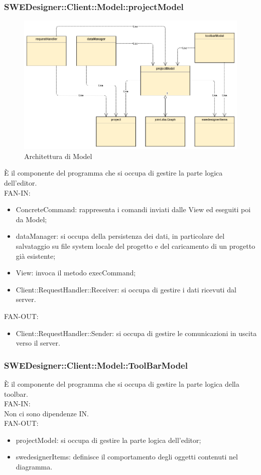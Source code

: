 \documentclass[../PianoDiQualifica.tex]{subfiles}
\begin{document}
		\subsubsection{SWEDesigner::Client::Model::projectModel}
			\begin{figure}[H]\label{fig:Model}
				\centering
				\includegraphics[scale=0.46]{Immagini/DiagrammaArchitettura/MainModel.png}
				\caption{Architettura di Model}
			\end{figure}
		È il componente del programma che si occupa di gestire la parte logica dell’editor.\\
		FAN-IN:
		\begin{itemize}
			\item ConcreteCommand: rappresenta i comandi inviati dalle View ed eseguiti poi da Model;
			\item dataManager: si occupa della persistenza dei dati, in particolare del salvataggio su file system locale del progetto e del caricamento di un progetto già esistente;
			\item View: invoca il metodo execCommand;
			\item Client::RequestHandler::Receiver: si occupa di gestire i dati ricevuti dal server.
		\end{itemize}
		FAN-OUT:
		\begin{itemize}
			\item Client::RequestHandler::Sender: si occupa di gestire le comunicazioni in uscita verso il server.
		\end{itemize}
		
		\subsubsection{SWEDesigner::Client::Model::ToolBarModel}
		È il componente del programma che si occupa di gestire la parte logica della toolbar.\\
		FAN-IN:\\
		Non ci sono dipendenze IN. \\
		FAN-OUT:
		\begin{itemize}
			\item projectModel: si occupa di gestire la parte logica dell'editor;
			\item swedesignerItems: definisce il comportamento degli oggetti contenuti nel diagramma.
		\end{itemize}
	
\end{document}
